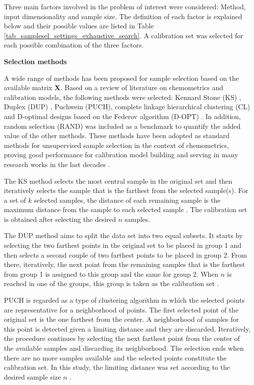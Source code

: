 \documentclass[journal=ancham,manuscript=article]{achemso}
\begin{document}
Three main factors involved in the problem of interest were considered: Method, input dimensionality and sample size. The definition of each factor is explained below and their possible values are listed in Table \ref{tab_samplesel_settings_exhaustive_search}. A calibration set was selected for each possible combination of the three factors.

\textbf{Selection methods}

A wide range of methods has been proposed for sample selection based on the available matrix $\mathbf{X}$. Based on a review of literature on chemometrics and calibration models, the following methods were selected: Kennard Stone (KS) \cite{Kennard1969}, Duplex (DUP) \cite{Snee1977}, Puchwein (PUCH)\cite{Puchwein1988}, complete linkage hierarchical clustering (CL) \cite{Naes1990} and D-optimal designs based on the Federov algorithm (D-OPT) \cite{Goos2011}. In addition, random selection (RAND) was included  as a benchmark to quantify the added value of the other methods. These methods have been adopted as standard methods for unsupervised sample selection in the context of chemometrics, proving good performance for calibration model building and serving in many research works in the last decades \cite{Naes1990, Brandmaier2012, Saeys2019, Au2020, Aernouts2011}.

The KS method selects the most central sample in the original set and then iteratively selects the sample that is the farthest from the selected sample(s). For a set of $k$ selected samples, the distance of each remaining sample is the maximum distance from the sample to each selected sample \cite{Kennard1969}. The calibration set is obtained after selecting the desired $n$ samples.

The DUP method aims to split the data set into two equal subsets. It starts by selecting the two farthest points in the original set to be placed in group 1 and then selects a second couple of two farthest points to be placed in group 2. From there, iteratively, the next point from the remaining samples that is the farthest from group 1 is assigned to this group and the same for group 2. When $n$ is reached in one of the groups, this group is taken as the calibration set \cite{Snee1977}.

PUCH is regarded as a type of clustering algorithm in which the selected points are representative for a neighborhood of points. The first selected point of the original set is the one farthest from the center. A neighborhood of samples for this point is detected given a limiting distance and they are discarded. Iteratively, the procedure continues by selecting the next farthest point from the center of the available samples and discarding its neighborhood. The selection ends when there are no more samples available and the selected points constitute the calibration set. In this study, the limiting distance was set according to the desired sample size $n$ \cite{Puchwein1988}.
\end{document}
